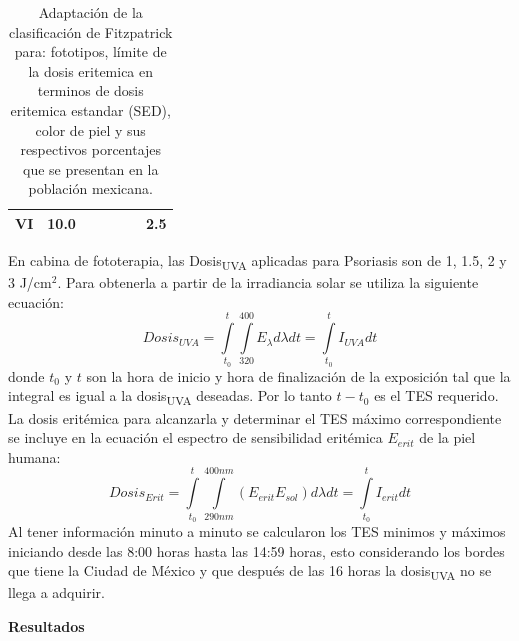 \documentclass{article}
\begin{document}
\begin{multicols}{2}
\begin{center}
\begin{table}[H]
\begin{tabulary}{1.0\linewidth}{ccccccc}
        VI 	&10.0 	&	&  &	&	&2.5	\\ \hline
    \end{tabulary}
    \caption{{Adaptación de la clasificación de Fitzpatrick para: fototipos, límite de la dosis eritemica en terminos de dosis eritemica estandar (SED), color de piel y sus respectivos porcentajes que se presentan en la población mexicana.{\label{fig:fototipo}}}}
    \end{table}
\end{center}
 \vspace{-0.5cm}
En cabina de fototerapia, las Dosis\textsubscript{UVA} aplicadas para Psoriasis son de 1, 1.5, 2 y 3 J/cm$^2$. 
Para obtenerla a partir de la irradiancia solar se utiliza la siguiente ecuación:
\begin{equation*}
    Dosis_{UVA}=\int\limits_{t_0}^t\int\limits_{320}^{400} E_{\lambda} d\lambda dt =\int\limits_{t_0}^{t}I_{UVA}dt
\end{equation*}
donde $t_0$ y $t$ son la hora de inicio y hora de finalización de la exposición tal que la integral es igual a la dosis\textsubscript{UVA} deseadas.
Por lo tanto $t-t_0$ es el TES requerido. La dosis eritémica para alcanzarla y determinar el TES máximo correspondiente se incluye en la ecuación el espectro de sensibilidad eritémica $E_{erit}$ de la piel humana:
\begin{equation*}
    Dosis_{Erit}=\int\limits_{t_0}^{t} \int\limits_{290nm}^{400nm} \left( E_{erit}E_{sol}\right)d\lambda dt = \int\limits_{t_0}^{t}I_{erit}dt
\end{equation*}
Al tener información minuto a minuto se calcularon los TES minimos y máximos iniciando desde las 8:00 horas hasta las 14:59 horas, esto considerando los bordes que tiene la Ciudad de México y que después de las 16 horas la dosis\textsubscript{UVA} no se llega a adquirir.
\begin{center}
\begin{shaded}
\textbf{\textcolor{na}{Resultados}}
\end{shaded}
\end{center}
\vspace{-0.2cm}
\begin{figure}[H]
    \centering

\end{figure}
\end{multicols}
\end{document}
